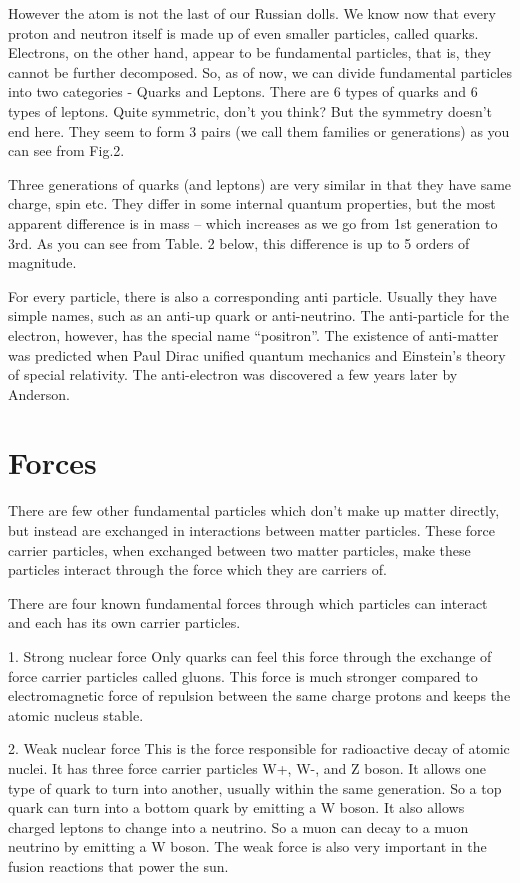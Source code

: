 However the atom is not the last of our Russian dolls. We know now that every proton and neutron itself is made up of even smaller particles, called quarks. Electrons, on the other hand, appear to be fundamental particles, that is, they cannot be further decomposed. 
So, as of now, we can divide fundamental particles into two categories - Quarks and Leptons.  There are 6 types of quarks and 6 types of leptons. Quite symmetric, don’t you think?  But the symmetry doesn’t end here. They seem to form 3 pairs (we call them families or generations) as you can see from Fig.2. 

Three generations of quarks (and leptons) are very similar in that they have same charge, spin etc. They differ in some internal quantum properties, but the most apparent difference is in mass – which increases as we go from 1st generation to 3rd.  As you can see from Table. 2 below, this difference is up to 5 orders of magnitude.

For every particle, there is also a corresponding anti particle.  Usually they have simple names, such as an anti-up quark or anti-neutrino.  The anti-particle for the electron, however, has the special name “positron”.  The existence of anti-matter was predicted when Paul Dirac unified quantum mechanics and Einstein’s theory of special relativity.  The anti-electron was discovered a few years later by Anderson.

\section{Forces} 
There are few other fundamental particles which don’t make up matter directly, but instead are exchanged in interactions between matter particles. These force carrier particles, when exchanged between two matter particles, make these particles interact through the force which they are carriers of. 

There are four known fundamental forces through which particles can interact and each has its own carrier particles. 

1.	Strong nuclear force 
Only quarks can feel this force through the exchange of force carrier particles called gluons. This force is much stronger compared to electromagnetic force of repulsion between the same charge protons and keeps the atomic nucleus stable.

2.	Weak nuclear force 
This is the force responsible for radioactive decay of atomic nuclei.  It has three force carrier particles W+, W-, and Z boson. It allows one type of quark to turn into another, usually within the same generation.  So a top quark can turn into a bottom quark by emitting a W boson.  It also allows charged leptons to change into a neutrino.  So a muon can decay to a muon neutrino by emitting a W boson.  The weak force is also very important in the fusion reactions that power the sun.

